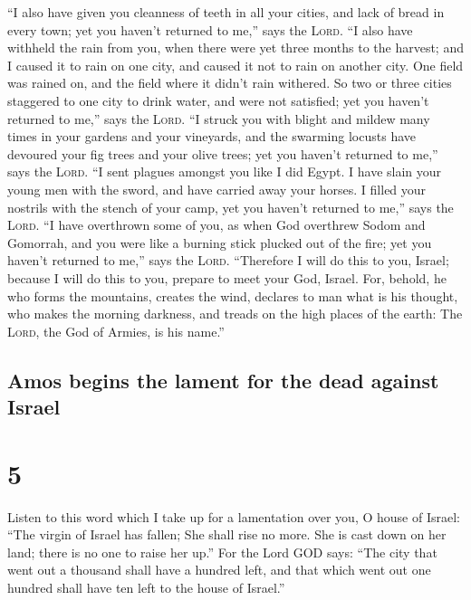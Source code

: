  ``I also have given you cleanness of teeth in all your
cities, and lack of bread in every town; yet you haven't returned to
me,'' says the \textsc{Lord}.  ``I also have withheld the
rain from you, when there were yet three months to the harvest; and I
caused it to rain on one city, and caused it not to rain on another
city. One field was rained on, and the field where it didn't rain
withered.  So two or three cities staggered to one city to
drink water, and were not satisfied; yet you haven't returned to me,''
says the \textsc{Lord}.  ``I struck you with blight and
mildew many times in your gardens and your vineyards, and the swarming
locusts have devoured your fig trees and your olive trees; yet you
haven't returned to me,'' says the \textsc{Lord}.  ``I
sent plagues amongst you like I did Egypt. I have slain your young men
with the sword, and have carried away your horses. I filled your
nostrils with the stench of your camp, yet you haven't returned to me,''
says the \textsc{Lord}.  ``I have overthrown some of you,
as when God overthrew Sodom and Gomorrah, and you were like a burning
stick plucked out of the fire; yet you haven't returned to me,'' says
the \textsc{Lord}.  ``Therefore I will do this to you,
Israel; because I will do this to you, prepare to meet your God, Israel.
 For, behold, he who forms the mountains, creates the
wind, declares to man what is his thought, who makes the morning
darkness, and treads on the high places of the earth: The \textsc{Lord},
the God of Armies, is his name.''

\hypertarget{amos-begins-the-lament-for-the-dead-against-israel}{%
\subsection{Amos begins the lament for the dead against
Israel}\label{amos-begins-the-lament-for-the-dead-against-israel}}

\hypertarget{section-4}{%
\section{5}\label{section-4}}

 Listen to this word which I take up for a lamentation
over you, O house of Israel:  ``The virgin of Israel has
fallen; She shall rise no more. She is cast down on her land; there is
no one to raise her up.''  For the Lord GOD says: ``The
city that went out a thousand shall have a hundred left, and that which
went out one hundred shall have ten left to the house of Israel.''

